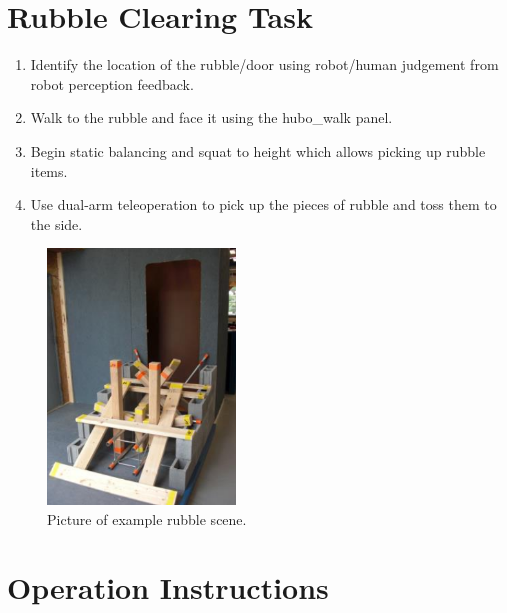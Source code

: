 \documentclass[letterpaper, 10 pt]{report}
\begin{document}
\newpage

%
\section*{Rubble Clearing Task}
\begin{enumerate}
\item Identify the location of the rubble/door using robot/human judgement from robot perception feedback.
\item Walk to the rubble and face it using the hubo\_walk panel.
\item Begin static balancing and squat to height which allows picking up rubble items.
\item Use dual-arm teleoperation to pick up the pieces of rubble and toss them to the side.
\end{enumerate}
\begin{figure}[h]
  \centering
  \includegraphics[width=5.0cm]{resources/rubble-clearing}
  \caption{Picture of example rubble scene.}
  \label{fig:Rubble-image}
\end{figure}

\newpage

%
\section*{Operation Instructions}
\end{document}
